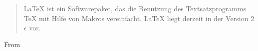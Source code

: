 \newenvironment{myquote}[1]{
	\begin{quote}
}{	
	\end{quote}
	From #1:
}
 
\begin{myquote}{Wikipedia}
	{\LaTeX} ist ein Softwarepaket, das die Benutzung des Textsatzprogramms TeX mit Hilfe von Makros vereinfacht. LaTeX liegt derzeit in der Version 2$\epsilon$ vor.
\end{myquote}

